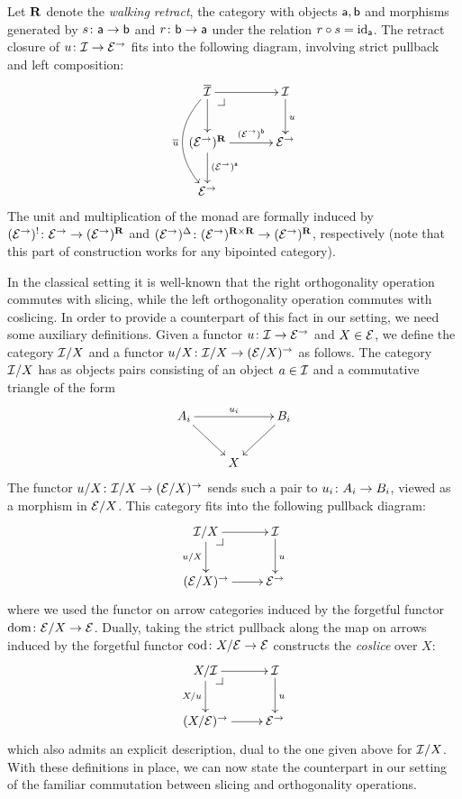 \documentclass[reqno,10pt,a4paper,oneside,draft]{amsart}
\begin{document}
\begin{remark}
Let $\ret$ denote the \emph{walking retract}, \ie the category with objects $\retA, \retB$ and morphisms generated by $s \co \retA \to \retB$ and $r \co \retB \to \retA$ under the relation $r \cc s = \id_{\retA}$.
The retract closure of $u \co \cal{I} \to \catE^\to$ fits into the following diagram, involving strict pullback and left composition:
\[
\xymatrix@C+1em{
  \overline{\cal{I}}
  \ar[r]
  \ar[d]
  \ar@/_2em/[dd]_{\overline{u}}
  \pullback{dr}
&
  \cal{I}
  \ar[d]^{u}
\\
  (\catE^\to)^{\ret}
  \ar[r]^-{(\catE^\to)^{\retB}}
  \ar[d]^{(\catE^\to)^{\retA}}
&
  \catE^\to
\\
  \catE^\to
}
\]
The unit and multiplication of the monad are formally induced by $(\catE^\to)^{\canonical} \co \catE^\to \to (\catE^\to)^{\ret}$ and $(\catE^\to)^{\Delta} \co (\catE^\to)^{\ret \times \ret} \to (\catE^\to)^{\ret}$, respectively (note that this part of construction works for any bipointed category).
\end{remark}


In the classical setting it is well-known that the right orthogonality operation commutes with slicing, while the left orthogonality operation commutes with coslicing.
In order to provide a counterpart of this fact in our setting, we need some auxiliary definitions.
Given a functor $u \co \cal{I} \to \catE^\to$ and $X \in \catE$, we define the category $\cal{I}/X$ and a functor $u/X \co \cal{I}/X \to (\cal{E}/X)^\to$ as follows. 
The category $\cal{I}/X$ has as objects pairs consisting of an object $a \in \cal{I}$ and a commutative triangle of the form
\[
\xymatrix{
  A_i \ar[dr] \ar[rr]^{u_i} & & B_i \ar[dl] \\
  & X
}
\]
The functor $u/X \co \cal{I}/X \to (\cal{E}/X)^\to$ sends such a pair to $u_i \co A_i \to B_i$, viewed as a morphism in $\cal{E}/X$.
This category fits into the following pullback diagram:
\[
\xymatrix{
  \cal{I}/X
  \ar[r]
  \ar[d]_{u/X}
  \pullback{dr}
&
  \cal{I}
  \ar[d]^{u}
\\
  (\catE/X)^\to
  \ar[r]
&
  \catE^\to
}
\]
where we used the functor on arrow categories induced by the forgetful functor $\operatorname{dom} \co \catE/X \to \catE$.
Dually, taking the strict pullback along the map on arrows induced by the forgetful functor $\operatorname{cod} \co X/\cal{E} \to \catE$ constructs the \emph{coslice} over $X$:
\[
\xymatrix{
  X/\cal{I}
  \ar[r]
  \ar[d]_{X/u}
  \pullback{dr}
&
  \cal{I}
  \ar[d]^{u}
\\
  (X/\catE)^\to
  \ar[r]
&
  \catE^\to
}
\]
which also admits an explicit description, dual to the one given above for $\cal{I}/X$.
With these definitions in place, we can now state the counterpart in our setting of the familiar commutation between slicing and orthogonality operations.
\end{document}
